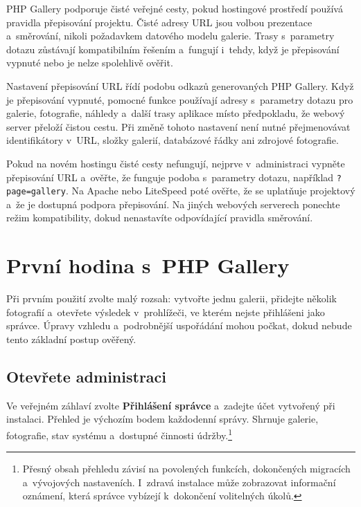 \documentclass[11pt,a4paper]{article}
\newcommand{\filepath}[1]{\path{#1}}
\newcommand{\ui}[1]{\textbf{#1}}
\newcommand{\codeword}[1]{\nolinkurl{#1}}
\begin{document}
PHP Gallery podporuje čisté veřejné cesty, pokud hostingové prostředí používá
pravidla přepisování projektu. Čisté adresy URL jsou volbou prezentace
a~směrování, nikoli požadavkem datového modelu galerie. Trasy s~parametry dotazu
zůstávají kompatibilním řešením a~fungují i~tehdy, když je přepisování vypnuté
nebo je nelze spolehlivě ověřit.

Nastavení přepisování URL řídí podobu odkazů generovaných PHP Gallery. Když je
přepisování vypnuté, pomocné funkce používají adresy s~parametry dotazu pro
galerie, fotografie, náhledy a~další trasy aplikace místo předpokladu, že webový
server přeloží čistou cestu. Při změně tohoto nastavení není nutné přejmenovávat
identifikátory v~URL, složky galerií, databázové řádky ani zdrojové fotografie.

Pokud na novém hostingu čisté cesty nefungují, nejprve v~administraci vypněte
přepisování URL a~ověřte, že funguje podoba s~parametry dotazu, například
\codeword{?page=gallery}. Na Apache nebo LiteSpeed poté ověřte, že se uplatňuje
projektový \filepath{.htaccess} a~že je dostupná podpora přepisování. Na jiných
webových serverech ponechte režim kompatibility, dokud nenastavíte odpovídající
pravidla směrování.

\section{První hodina s~PHP Gallery}
\label{sec:first-hour}

Při prvním použití zvolte malý rozsah: vytvořte jednu galerii, přidejte několik
fotografií a~otevřete výsledek v~prohlížeči, ve kterém nejste přihlášeni jako
správce. Úpravy vzhledu a~podrobnější uspořádání mohou počkat, dokud nebude
tento základní postup ověřený.

\subsection{Otevřete administraci}

Ve veřejném záhlaví zvolte \ui{Přihlášení správce} a~zadejte účet vytvořený při
instalaci. Přehled je výchozím bodem každodenní správy. Shrnuje galerie,
fotografie, stav systému a~dostupné činnosti údržby.\footnote{Přesný obsah
přehledu závisí na povolených funkcích, dokončených migracích a~vývojových
nastaveních. I~zdravá instalace může zobrazovat informační oznámení, která
správce vybízejí k~dokončení volitelných úkolů.}
\end{document}
